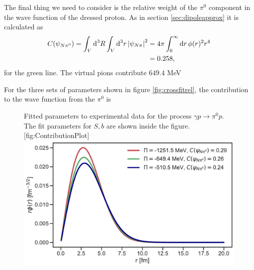The final thing we need to consider is the relative weight of the $\pi^0$ component in the wave function of the dressed proton. As in section \ref{sec:dipoleapprox} it is calculated as 
\begin{align}
	C(\psi_{N\pi^0})= \int_V \text{d}^3R \int_V \text{d}^3 r \, \abs{\psi_{N\pi}}^2 &= 4\pi \int_0^\infty \text{d}r \, \phi(r)^2r^4 \\
	&= 0.258, 
\end{align}
for the green line. The virtual pions contribute $649.4$ MeV

For the three sets of parameters shown in figure \ref{fig:crossfitrel}, the contribution to the wave function from the $\pi^0$ is

\begin{figure}[H]
	\begin{sidecaption}{Fitted parameters to experimental data for the process $\gamma p \rightarrow \pi^0 p$. The fit parameters for $S,b$ are shown inside the figure.}[fig:ContributionPlot]
		\includegraphics[width=\linewidth]{Figures/ContributionPlot.pdf} 
	\end{sidecaption}
\end{figure}
